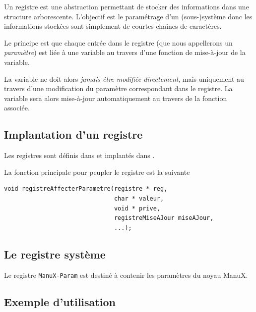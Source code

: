    Un registre est une abstraction permettant de stocker des
informations dans une structure arborescente. L'objectif est le
paramétrage d'un (sous-)système donc les informations stockées sont
simplement de courtes chaînes de caractères.

   Le principe est que chaque entrée dans le registre (que nous
appellerons un {\em paramètre}) est liée à une variable au travers
d'une fonction de mise-à-jour de la variable.

   La variable ne doit alors {\em jamais être modifiée directement},
mais uniquement au travers d'une modification du paramètre
correspondant dans le registre. La variable sera alors mise-à-jour
automatiquement au travers de la fonction associée.

\subsection{Implantation d'un registre}

   Les registres sont définis dans  et
implantés dans .

La fonction principale pour peupler le registre est la suivante

\begin{lstlisting}
void registreAffecterParametre(registre * reg,
                               char * valeur,
                               void * prive,
                               registreMiseAJour miseAJour,
                               ...);
\end{lstlisting}
   
%
\subsection{Le registre système}

   Le registre {\tt ManuX-Param} est destiné à contenir les paramètres
du noyau ManuX.

%
\subsection{Exemple d'utilisation}


